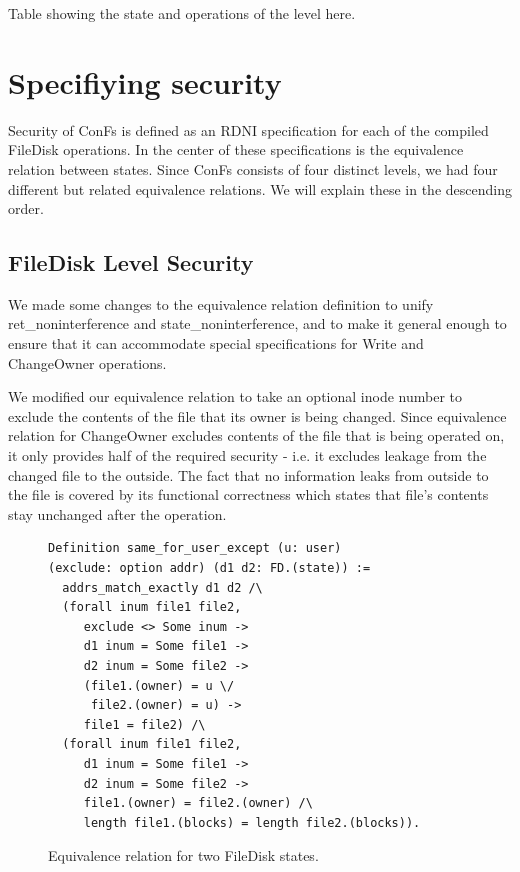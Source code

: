 {\color{red} Table showing the state and operations of the level here}.

\section{Specifiying security}
Security of ConFs is defined as an RDNI specification for each of the compiled FileDisk operations. In the center of these specifications is the equivalence relation between states. Since ConFs consists of four distinct levels, we had four different but related equivalence relations. We will explain these in the descending order.

\subsection{FileDisk Level Security}
We made some changes to the equivalence relation definition to unify ret\_noninterference and state\_noninterference, and to make it general enough to ensure that it can accommodate special specifications for Write and ChangeOwner operations.

We modified our equivalence relation to take an optional inode number to exclude the contents of the file that its owner is being changed.
Since equivalence relation for ChangeOwner excludes contents of the file that is being operated on, it only provides half of the required security - i.e. it excludes leakage from the changed file to the outside. The fact that no information leaks from outside to the file is covered by its functional correctness which states that file's contents stay unchanged after the operation.

\begin{figure}[H]
    \centering
\begin{verbatim}
Definition same_for_user_except (u: user) 
(exclude: option addr) (d1 d2: FD.(state)) :=
  addrs_match_exactly d1 d2 /\
  (forall inum file1 file2,
     exclude <> Some inum ->
     d1 inum = Some file1 ->
     d2 inum = Some file2 ->
     (file1.(owner) = u \/
      file2.(owner) = u) ->
     file1 = file2) /\
  (forall inum file1 file2,
     d1 inum = Some file1 ->
     d2 inum = Some file2 ->
     file1.(owner) = file2.(owner) /\ 
     length file1.(blocks) = length file2.(blocks)).
\end{verbatim}
    \caption{Equivalence relation for two FileDisk states.}
    \label{fig:eqivalence_for_filedisk}
\end{figure}


